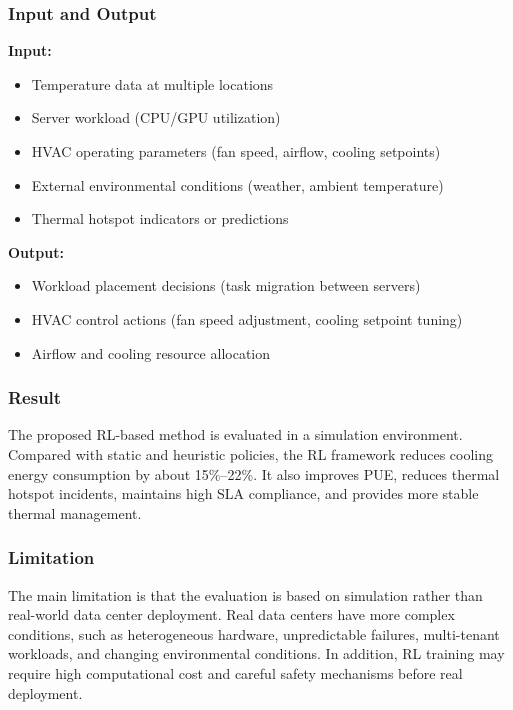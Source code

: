 \documentclass[12pt,a4paper]{article}
\begin{document}
    \subsubsection{Input and Output}
                \textbf{Input:}
                \begin{itemize}
                    \item Temperature data at multiple locations
                    \item Server workload (CPU/GPU utilization)
                    \item HVAC operating parameters (fan speed, airflow, cooling setpoints)
                    \item External environmental conditions (weather, ambient temperature)
                    \item Thermal hotspot indicators or predictions
                \end{itemize}
                
                \textbf{Output:}
                \begin{itemize}
                    \item Workload placement decisions (task migration between servers)
                    \item HVAC control actions (fan speed adjustment, cooling setpoint tuning)
                    \item Airflow and cooling resource allocation
                \end{itemize}

    \subsubsection{Result}
    The proposed RL-based method is evaluated in a simulation environment. Compared with static and heuristic policies, the RL framework reduces cooling energy consumption by about 15\%--22\%. It also improves PUE, reduces thermal hotspot incidents, maintains high SLA compliance, and provides more stable thermal management.

    \subsubsection{Limitation}
    The main limitation is that the evaluation is based on simulation rather than real-world data center deployment. Real data centers have more complex conditions, such as heterogeneous hardware, unpredictable failures, multi-tenant workloads, and changing environmental conditions. In addition, RL training may require high computational cost and careful safety mechanisms before real deployment.
\end{document}

